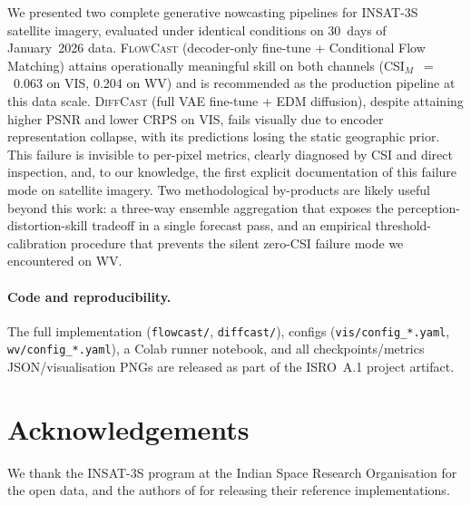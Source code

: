 \documentclass[11pt,a4paper]{article}
\begin{document}
We presented two complete generative nowcasting pipelines for {INSAT-3S}
satellite imagery, evaluated under identical conditions on 30~days of
January~2026 data. \textsc{FlowCast} (decoder-only fine-tune + Conditional
Flow Matching) attains operationally meaningful skill on both
channels (CSI$_M$~$=$~0.063 on VIS, 0.204 on WV) and is recommended as the
production pipeline at this data scale. \textsc{DiffCast} (full {VAE}
fine-tune + EDM diffusion), despite attaining higher PSNR and lower CRPS on
VIS, fails visually due to encoder representation collapse, with its
predictions losing the static geographic prior. This failure is invisible
to per-pixel metrics, clearly diagnosed by CSI and direct inspection, and,
to our knowledge, the first explicit documentation of this failure mode on
satellite imagery. Two methodological by-products are likely useful beyond
this work: a three-way ensemble aggregation that exposes the
perception-distortion-skill tradeoff in a single forecast pass, and an
empirical threshold-calibration procedure that prevents the silent
zero-CSI failure mode we encountered on WV.

\paragraph{Code and reproducibility.} The full implementation
(\texttt{flowcast/}, \texttt{diffcast/}), configs (\texttt{vis/config\_*.yaml},
\texttt{wv/config\_*.yaml}), a Colab runner notebook, and all
checkpoints/metrics JSON/visualisation PNGs are released as part of the
ISRO~A.1 project artifact.

\section*{Acknowledgements}
We thank the {INSAT-3S} program at the Indian Space Research Organisation
for the open data, and the authors of \citet{flowcast2026, karras2022edm,
gao2022earthformer} for releasing their reference implementations.


\end{document}
